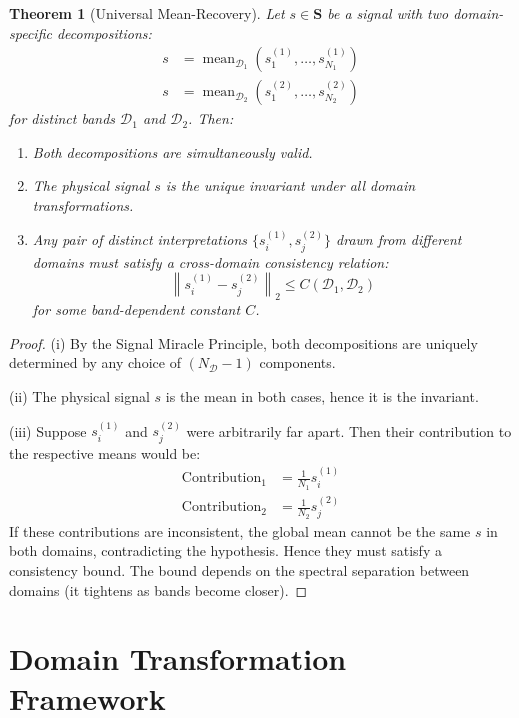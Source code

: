 \documentclass[twocolumn,11pt,a4paper]{article}
\newtheorem{theorem}{Theorem}[section]
\newcommand{\signal}{s}
\newcommand{\Signal}{\mathbf{S}}
\newcommand{\domain}{\mathcal{D}}
\newcommand{\mean}{\operatorname{mean}}
\begin{document}
\begin{theorem}[Universal Mean-Recovery]
\label{thm:universal_mean_recovery}
Let $\signal \in \Signal$ be a signal with two domain-specific decompositions:
\begin{align}
  \signal &= \mean_{\domain_1}(\signal_1^{(1)}, \ldots, \signal_{N_1}^{(1)})\\
  \signal &= \mean_{\domain_2}(\signal_1^{(2)}, \ldots, \signal_{N_2}^{(2)})
\end{align}
for distinct bands $\domain_1$ and $\domain_2$. Then:
\begin{enumerate}[nosep,label=(\roman*)]
  \item Both decompositions are simultaneously valid.
  \item The physical signal $\signal$ is the unique invariant under all domain transformations.
  \item Any pair of distinct interpretations $\{\signal_i^{(1)}, \signal_j^{(2)}\}$ drawn from different domains must satisfy a cross-domain consistency relation:
  \begin{equation}
    \left\| \signal_i^{(1)} - \signal_j^{(2)} \right\|_2 \leq C(\domain_1, \domain_2)
  \end{equation}
  for some band-dependent constant $C$.
\end{enumerate}
\end{theorem}

\begin{proof}
(i) By the Signal Miracle Principle, both decompositions are uniquely determined by any choice of $(N_\domain - 1)$ components.

(ii) The physical signal $\signal$ is the mean in both cases, hence it is the invariant.

(iii) Suppose $\signal_i^{(1)}$ and $\signal_j^{(2)}$ were arbitrarily far apart. Then their contribution to the respective means would be:
\begin{align}
  \text{Contribution}_1 &= \frac{1}{N_1}\signal_i^{(1)}\\
  \text{Contribution}_2 &= \frac{1}{N_2}\signal_j^{(2)}
\end{align}
If these contributions are inconsistent, the global mean cannot be the same $\signal$ in both domains, contradicting the hypothesis. Hence they must satisfy a consistency bound. The bound depends on the spectral separation between domains (it tightens as bands become closer).
\end{proof}

\section{Domain Transformation Framework}
\label{sec:domain_transform}
\end{document}

